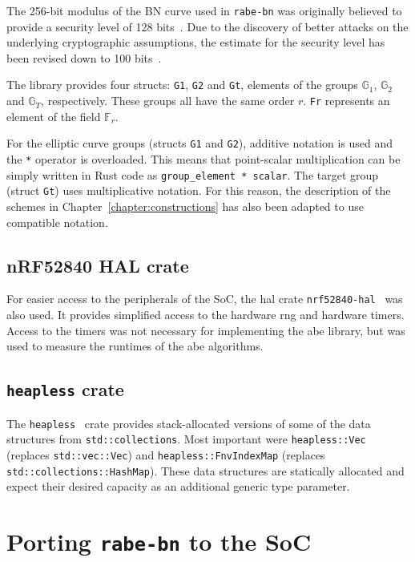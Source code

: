 The 256-bit modulus of the BN curve used in \texttt{rabe-bn} was originally believed to provide a security level of 128 bits~\cite{ben-sasson_succinct_2013}. 
Due to the discovery of better attacks on the underlying cryptographic assumptions, the estimate for the security level has been revised down to 100 bits~\cite{yonezawa_pairing-friendly_2019}.

The library provides four structs: \texttt{G1}, \texttt{G2} and \texttt{Gt}, elements of the groups $\mathbb{G}_1$, $\mathbb{G}_2$ and $\mathbb{G}_T$, respectively.
These groups all have the same order $r$.
\texttt{Fr} represents an element of the field $\mathbb{F}_r$.

For the elliptic curve groups (structs \texttt{G1} and \texttt{G2}), additive notation is used and the \texttt{*} operator is overloaded.
This means that point-scalar multiplication can be simply written in Rust code as \verb$group_element * scalar$.
The target group (struct \texttt{Gt}) uses multiplicative notation.
For this reason, the description of the schemes in Chapter~\ref{chapter:constructions} has also been adapted to use compatible notation.

\subsection*{nRF52840 HAL crate}
For easier access to the peripherals of the SoC, the \acrfull{hal} \gls{crate} \texttt{nrf52840-hal}~\cite{noauthor_nrf52840-hal_nodate} was also used.
It provides simplified access to the hardware \acrfull{rng} and hardware timers.
Access to the timers was not necessary for implementing the \acrshort{abe} library, but was used to measure the runtimes of the \acrshort{abe} algorithms.

\subsection*{\texttt{heapless} crate}
The \texttt{heapless}~\cite{aparicio_heapless_nodate} crate provides stack-allocated versions of some of the data structures from \texttt{std::collections}. 
Most important were \texttt{heapless::Vec} (replaces \texttt{std::vec::Vec}) and \texttt{heapless::FnvIndexMap} (replaces \texttt{std::collections::HashMap}).
These data structures are statically allocated and expect their desired capacity as an additional generic type parameter.

\section{Porting \texttt{rabe-bn} to the SoC}

